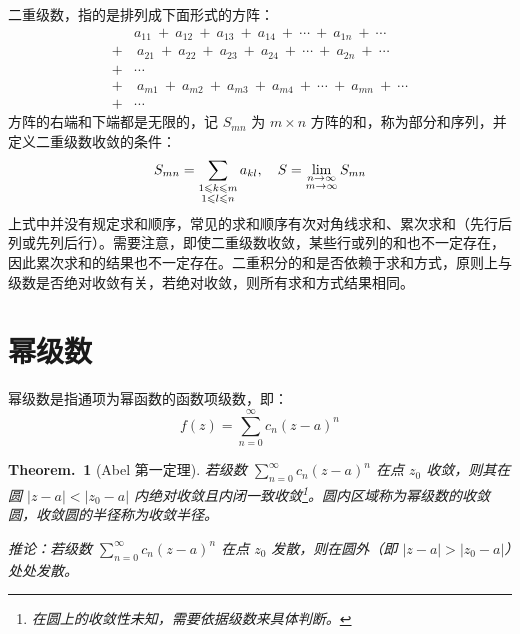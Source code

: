 \documentclass[UTF8]{report}
\theoremstyle{MyLineTheoremStyle} %
\theoremstyle{MyBlockTheoremStyle} %
\newtheorem{BlockTheorem}[LineTheorem]{Theorem.\,} %
\theoremstyle{MySubsubsectionStyle} %
\begin{document}
二重级数，指的是排列成下面形式的方阵：
\begin{equation}
    \begin{aligned}
        &a_{11}\:+\:a_{12}\:+\:a_{13}\:+\:a_{14}\:+\:\cdots\:+\:a_{1n}\:+\:\cdots  \\
        +&\:a_{21}\:+\:a_{22}\:+\:a_{23}\:+\:a_{24}\:+\:\cdots\:+\:a_{2n}\:+\:\cdots  \\
        +&\cdots  \\
        +&\:a_{m1}\:+\:a_{m2}\:+\:a_{m3}\:+\:a_{m4}\:+\:\cdots\:+\:a_{mn}\:+\:\cdots  \\
        +&\cdots 
    \end{aligned}
\end{equation}
方阵的右端和下端都是无限的，记 $S_{mn}$ 为 $m\times n$ 方阵的和，称为部分和序列，并定义二重级数收敛的条件：
\begin{equation}
    S_{m n} = \sum_{\begin{subarray}{c} 1 \leqslant k \leqslant m \\ 1 \leqslant l \leqslant n \end{subarray}} a_{k l},\quad S = \lim_{\begin{subarray}{c} n \to \infty \\ m \to \infty \end{subarray}} S_{m n}
\end{equation}
上式中并没有规定求和顺序，常见的求和顺序有次对角线求和、累次求和（先行后列或先列后行）。需要注意，即使二重级数收敛，某些行或列的和也不一定存在，因此累次求和的结果也不一定存在。二重积分的和是否依赖于求和方式，原则上与级数是否绝对收敛有关，若绝对收敛，则所有求和方式结果相同。

\section{幂级数}

幂级数是指通项为幂函数的函数项级数，即：
\begin{equation}
    f(z) = \sum_{n = 0}^{\infty} c_n (z - a)^n
\end{equation}


\begin{BlockTheorem}[Abel 第一定理]\label{Abel 第一定理}
    若级数 $\sum_{n = 0}^{\infty} c_n (z - a)^n$ 在点 $z_0$ 收敛，则其在圆 $| z - a | < | z_0 - a |$ 内绝对收敛且内闭一致收敛\footnote{在圆上的收敛性未知，需要依据级数来具体判断。}。圆内区域称为幂级数的收敛圆，收敛圆的半径称为收敛半径。
    \par 
    推论：若级数 $\sum_{n = 0}^{\infty} c_n (z - a)^n$ 在点 $z_0$ 发散，则在圆外（即 $| z - a | > | z_0 - a |$）处处发散。 
\end{BlockTheorem}
\end{document}
